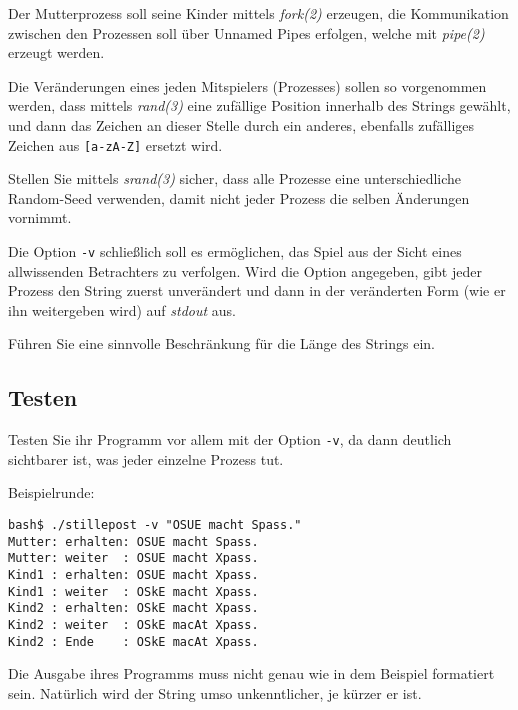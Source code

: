 Der Mutterprozess soll seine Kinder mittels \emph{fork(2)} erzeugen,
die Kommunikation zwischen den Prozessen soll über Unnamed Pipes
erfolgen, welche mit \emph{pipe(2)} erzeugt werden.

Die Veränderungen eines jeden Mitspielers (Prozesses) sollen so
vorgenommen werden, dass mittels \emph{rand(3)} eine zufällige
Position innerhalb des Strings gewählt, und dann das Zeichen an
dieser Stelle durch ein anderes, ebenfalls zufälliges Zeichen aus
{\tt [a-zA-Z]} ersetzt wird.

Stellen Sie mittels \emph{srand(3)} sicher, dass alle Prozesse eine
unterschiedliche Random-Seed verwenden, damit nicht jeder Prozess die
selben Änderungen vornimmt.

Die Option {\tt -v} schließlich soll es ermöglichen, das Spiel aus
der Sicht eines allwissenden Betrachters zu verfolgen. Wird die Option
angegeben, gibt jeder Prozess den String zuerst unverändert und dann
in der veränderten Form (wie er ihn weitergeben wird) auf
\emph{stdout} aus.

Führen Sie eine sinnvolle Beschränkung für die Länge des Strings
ein.

\subsection*{Testen}

Testen Sie ihr Programm vor allem mit der Option {\tt -v}, da dann
deutlich sichtbarer ist, was jeder einzelne Prozess tut.

Beispielrunde:
\begin{verbatim}
bash$ ./stillepost -v "OSUE macht Spass."
Mutter: erhalten: OSUE macht Spass.
Mutter: weiter  : OSUE macht Xpass.
Kind1 : erhalten: OSUE macht Xpass.
Kind1 : weiter  : OSkE macht Xpass.
Kind2 : erhalten: OSkE macht Xpass.
Kind2 : weiter  : OSkE macAt Xpass.
Kind2 : Ende    : OSkE macAt Xpass.
\end{verbatim}

Die Ausgabe ihres Programms muss nicht genau wie in dem Beispiel
formatiert sein. Natürlich wird der String umso unkenntlicher, je
kürzer er ist.

\osueguidelinestwo


